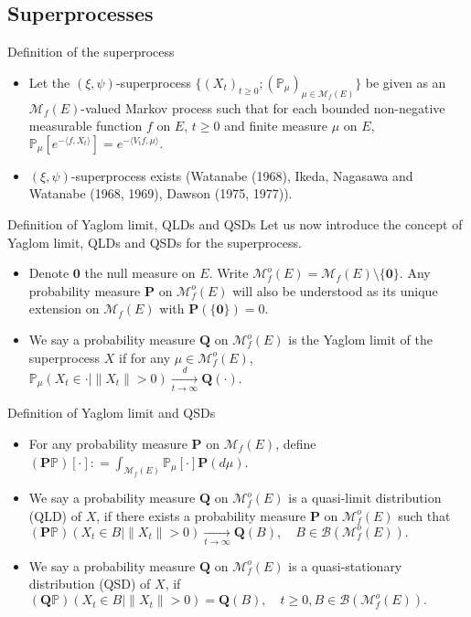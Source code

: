 \documentclass[xcolor=dvipsnames]{beamer}
\begin{document}
\subsection{Superprocesses}
\begin{frame}{Definition of the superprocess}
\begin{itemize}
	\item 
	Let the {\color{red} $(\xi,\psi)$-superprocess} $\{(X_t)_{t\geq 0}; (\mathbb P_\mu)_{\mu\in \mathcal M_f(E)}\}$ be given as an $\mathcal M_f(E)$-valued Markov process such that for each bounded non-negative measurable function $f$ on $E$, $t\geq 0$ and finite measure $\mu$ on $E$,
$
	\label{eq: def of V_t}
	\mathbb{P}_{\mu}[e^{-\langle f,X_t \rangle}]
	= e^{-\langle V_tf, \mu \rangle}.
$
	\item
	$(\xi, \psi)$-superprocess exists (Watanabe (1968), Ikeda, Nagasawa and Watanabe (1968, 1969), Dawson (1975, 1977)).
\end{itemize}
\end{frame}

\begin{frame}{Definition of Yaglom limit, QLDs and QSDs}
	Let us now introduce the concept of Yaglom limit, QLDs and QSDs for the superprocess.
\begin{itemize}
\item 
	Denote $\mathbf 0$ the {\color{red} null measure} on $E$. Write $\mathcal M_f^o(E) = \mathcal M_f(E)\setminus \{\mathbf 0\}$. Any probability measure $\mathbf P$ on $\mathcal M_f^o(E)$ will also be understood as its unique extension on $\mathcal M_f(E)$ with $\mathbf P(\{\mathbf 0\}) = 0$.
\item 
	We say a probability measure $\mathbf Q$ on $\mathcal M_f^o(E)$ is the {\color{red} Yaglom limit} of the superprocess $X$ if for any $\mu \in \mathcal M_f^o(E)$, 
$
	\mathbb P_\mu(X_t \in \cdot | \|X_t\| > 0) \xrightarrow[t\to \infty]{d} \mathbf Q(\cdot).
$ 
\end{itemize}
\end{frame}

\begin{frame}{Definition of Yaglom limit and QSDs}
\begin{itemize}
\item 
	For any probability measure $\mathbf P$ on $\mathcal M_f(E)$, define $(\mathbf P \mathbb P)[\cdot]: = \int_{\mathcal M_f(E)} \mathbb P_\mu[\cdot] \mathbf P(d\mu)$.
\item 
	We say a probability measure $\mathbf Q$ on $\mathcal M_f^o(E)$ is a {\color{red} quasi-limit distribution (QLD)} of $X$, if there exists a probability measure $\mathbf P$ on $\mathcal M_f^o(E)$ such that
$
	(\mathbf P \mathbb P)(X_t \in B|\|X_t\|>0) \xrightarrow[t\to \infty]{} \mathbf Q(B), \quad B\in \mathcal B(\mathcal M_f^o(E)).
$		
\item 
We say a probability measure $\mathbf Q$ on $\mathcal M_f^o(E)$ is a {\color{red} quasi-stationary distribution (QSD)} of $X$, if 
$
(\mathbf Q \mathbb P)(X_t \in B|\|X_t\|>0) = \mathbf Q(B), \quad t\geq 0, B\in \mathcal B(\mathcal M_f^o(E)).
$		
\end{itemize}
\end{frame}
\end{document}
